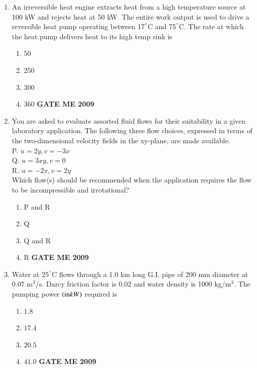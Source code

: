 \documentclass[journal]{IEEEtran}
\begin{document}
\begin{enumerate}[leftmargin=0pt]
\item An irreversible heat engine extracts heat from a high temperature source at 100 kW and rejects heat at 50 kW. The entire work output is used to drive a reversible heat pump operating between 17$^\degree$C and 75$^\degree$C. The rate  at which the heat pump delivers heat to its high temp sink is
\begin{enumerate}[label=(\Alph*)]
  \item $50$
  \item $250$
  \item $300$
  \item $360$
\hfill{\textbf{GATE ME 2009}}
\end{enumerate}

\item You are asked to evaluate assorted fluid flows for their suitability in a given laboratory application.
The following three flow choices, expressed in terms of the two-dimensional velocity fields in the
xy-plane, are made available.\\
P. $u =2y, v =-3x$\\
Q. $u =3xy, v = 0$\\
R. $u=-2x, v=2y$\\
Which flow(s) should be recommended when the application requires the flow to be incompressible and
irrotational?

\begin{enumerate}[label=(\Alph*)]
  \item P and R
  \item Q
  \item Q and R
  \item R
\hfill{\textbf{GATE ME 2009}}
\end{enumerate}

\item Water at 25$^\degree$C flows through a 1.0 km long G.I. pipe of 200 mm diameter at $0.07$ m$^3$/s. Darcy friction factor is 0.02 and water density is 1000 kg/m$^3$. The pumping power $\left(\text{in} kW\right)$ required is
\begin{enumerate}[label=(\Alph*)]
  \item $1.8$
  \item $17.4$
  \item $20.5$
  \item $41.0$
\hfill{\textbf{GATE ME 2009}}
\end{enumerate}









\end{enumerate}
\end{document}
